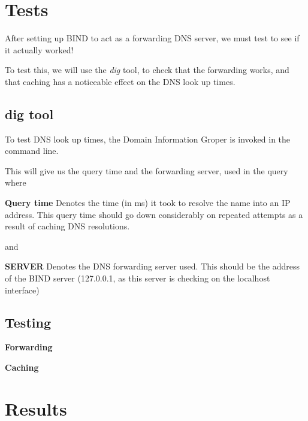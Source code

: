 \section{Tests}
After setting up BIND to act as a forwarding DNS server, we must test to see if it actually worked!

To test this, we will use the \textit{dig} tool, to check that the forwarding works, and that caching has a noticeable effect on the DNS look up times. 
\subsection{dig tool}
To test DNS look up times, the Domain Information Groper is invoked in the command line.

This will give us the query time and the forwarding server, used in the query where

\textbf{Query time}
Denotes the time (in ms) it took to resolve the name into an IP address.
This query time should go down considerably on repeated attempts as a result of caching DNS resolutions.

and

\textbf{SERVER}
Denotes the DNS forwarding server used. This should be the address of the BIND server (127.0.0.1, as this server is checking on the localhost interface)


\subsection{Testing}
\textbf{Forwarding}

\textbf{Caching}

\section{Results}





